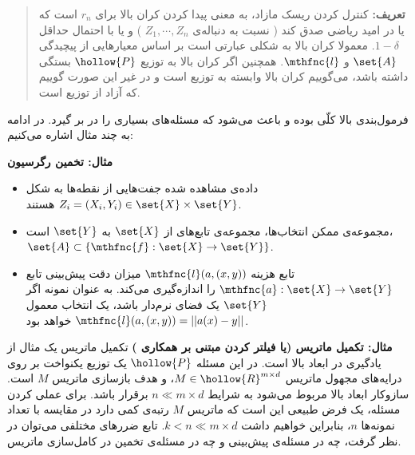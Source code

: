 \begin{quote}
{\bf
تعریف:
} 
کنترل کردن ریسک مازاد، به معنی پیدا کردن کران بالا برای 
$r_n$ 
است که یا در امید ریاضی
صدق کند ( نسبت به دنباله‌ی 
$Z_1,\cdots,Z_n$ 
) و یا با احتمال حداقل 
$1 - \delta$. 
معمولا کران بالا به شکلی عبارتی است بر اساس معیارهایی از پیچیدگی
$\set{A}$ 
و 
$\mthfnc{l}$. 
همچنین اگر کران بالا به توزیع 
$\hollow{P}$ 
بستگی داشته باشد، می‌گوییم کران بالا وابسته به توزیع
است و در غیر این صورت گوییم که آزاد از توزیع
است.

\end{quote}


فرمول‌بندی بالا کلّی بوده و باعث می‌شود که مسئله‌های بسیاری را در بر گیرد. در ادامه به چند مثال اشاره می‌کنیم:

{\bf
مثال: تخمین رگرسیون
} 
\begin{itemize}
\item
داده‌ی مشاهده شده جفت‌هایی از نقطه‌ها به شکل 
$ Z_i = ( X_i, Y_i ) \in \set{X} \times \set{Y} $ 
هستند.


\item
مجموعه‌ی ممکن انتخاب‌ها، مجموعه‌ی تابع‌های از 
$\set{X}$ 
به 
$\set{Y}$ 
است، 
$\set{A} \subset \{ \mthfnc{f} : \set{X} \rightarrow \set{Y} \} $.


\item
تابع هزینه 
$\mthfnc{l}(a, (x,y) )$ 
میزان دقت پیش‌بینی تابع 
$\mthfnc{a}: \set{X} \rightarrow \set{Y}$ 
را اندازه‌گیری می‌کند. به عنوان نمونه اگر 
$\set{Y}$ 
یک فضای نرم‌دار
 باشد، یک انتخاب معمول 
$\mthfnc{l}(a, (x,y)) = || a(x) - y ||$ 
خواهد بود.

\end{itemize}

{\bf
مثال: تکمیل ماتریس
 (یا فیلتر کردن مبتنی بر همکاری
 )
} 
تکمیل ماتریس یک مثال از یادگیری در ابعاد بالا
است. در این مسئله 
$\hollow{P}$ 
یک توزیع یکنواخت بر روی درایه‌های مجهول ماتریس 
$ M \in \hollow{R}^{m \times d }$، 
و هدف بازسازی ماتریس 
$M$ 
است. سازوکار ابعاد بالا مربوط می‌شود به شرایط 
$ n \ll m \times d$ 
برقرار باشد. برای عملی
کردن مسئله، یک فرض طبیعی این است که ماتریس 
$M$ 
رتبه‌ی
کمی دارد در مقایسه با تعداد نمونه‌ها 
$n$، 
بنابراین خواهیم داشت 
$k < n \ll m \times d$. 
تابع ضررهای مختلفی می‌توان در نظر گرفت، چه در مسئله‌ی پیش‌بینی و چه در مسئله‌ی تخمین در کامل‌سازی ماتریس.




